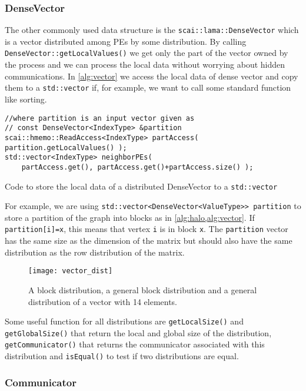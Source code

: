 \documentclass[a4paper,10pt]{article}
\newcommand{\MI}[1]{\texttt{#1}}
\begin{document}
\subsubsection*{DenseVector}

The other commonly used data structure is the \MI{scai::lama::DenseVector} which is a vector distributed
among PEs by some distribution. By calling \MI{DenseVector::getLocalValues()} we get only the part
of the vector owned by the process and we can process the local data without worrying about hidden
communications. In \cref{alg:vector} we access the local data of dense vector and copy them to 
a \MI{std::vector} if, for example, we want to call some standard function like sorting.

\begin{algorithm}
\begin{verbatim}
//where partition is an input vector given as
// const DenseVector<IndexType> &partition
scai::hmemo::ReadAccess<IndexType> partAccess( partition.getLocalValues() );
std::vector<IndexType> neighborPEs( 
	partAccess.get(), partAccess.get()+partAccess.size() );
\end{verbatim}
\caption{Code to store the local data of a distributed DenseVector to a \MI{std::vector}}
\label{alg:vector}
\end{algorithm}

For example, we are using \MI{std::vector<DenseVector<ValueType>> partition} to store a partition of the graph
into blocks as in \cref{alg:halo,alg:vector}. If \MI{partition[i]=x}, this means that vertex \MI{i}
is in block \MI{x}.
The \MI{partition} vector has the same size as the 
dimension of the matrix but should also have the same distribution as the row distribution of the matrix.


\begin{figure}
\centering
\texttt{[image: vector\_dist]}
\caption{A block distribution, a general block distribution and a general distribution of a vector
with 14 elements.}
\label{fig:dist}
\end{figure}

Some useful function for all distributions are \MI{getLocalSize()} and \MI{getGlobalSize()} that return
the local and global size of the distribution, \MI{getCommunicator()} that returns the communicator associated
with this distribution and \MI{isEqual()} to test if two distributions are equal.


\subsubsection*{Communicator}
\end{document}
